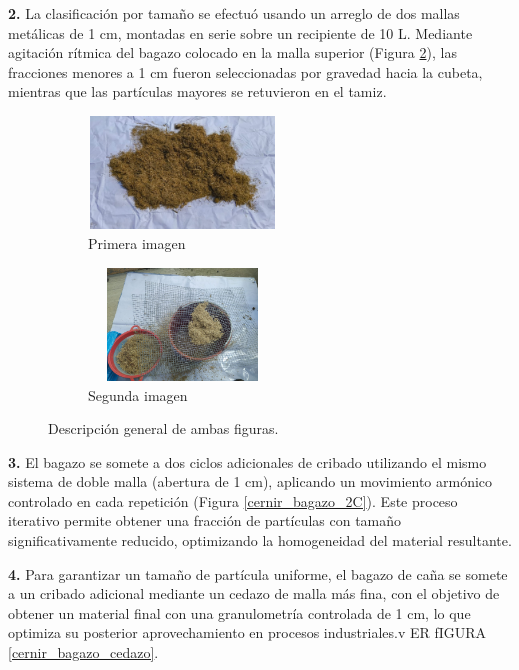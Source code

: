 \documentclass[12pt]{article}
\begin{document}
			
			\textbf{2.}	La clasificación por tamaño se efectuó usando un arreglo de dos mallas metálicas de 1 cm, montadas en serie sobre un recipiente de 10 L. Mediante agitación rítmica del bagazo colocado en la malla superior (Figura \ref{cernir_bagazo_B}), las fracciones menores a 1 cm fueron seleccionadas por gravedad hacia la cubeta, mientras que las partículas mayores se retuvieron en el tamiz.
					\begin{figure}[H]
			\centering
			\begin{subfigure}[b]{0.45\textwidth}
				\includegraphics[width=5cm, height=3cm]{imagenes/secado de bagazo}
				\caption{Primera imagen}
				\label{secado1}
			\end{subfigure}
			\hfill %
			\begin{subfigure}[b]{0.45\textwidth}
				\includegraphics[width=5cm, height=3cm]{imagenes/cernir_bagazo_1}
				\caption{Segunda imagen}
				\label{cernir_bagazo_B}
			\end{subfigure}
			\caption{Descripción general de ambas figuras.}
			\label{fig:ab}
		\end{figure}
			
			\textbf{3.}	El bagazo se somete a dos ciclos adicionales de cribado utilizando el mismo sistema de doble malla (abertura de 1 cm), aplicando un movimiento armónico controlado en cada repetición (Figura \ref{cernir_bagazo_2C}). Este proceso iterativo permite obtener una fracción de partículas con tamaño significativamente reducido, optimizando la homogeneidad del material resultante.
			
			
			\textbf{4.} Para garantizar un tamaño de partícula uniforme, el bagazo de caña se somete a un cribado adicional mediante un cedazo de malla más fina, con el objetivo de obtener un material final con una granulometría controlada de 1 cm, lo que optimiza su posterior aprovechamiento en procesos industriales.v	ER fIGURA \ref{cernir_bagazo_cedazo}.
			
\end{document}
